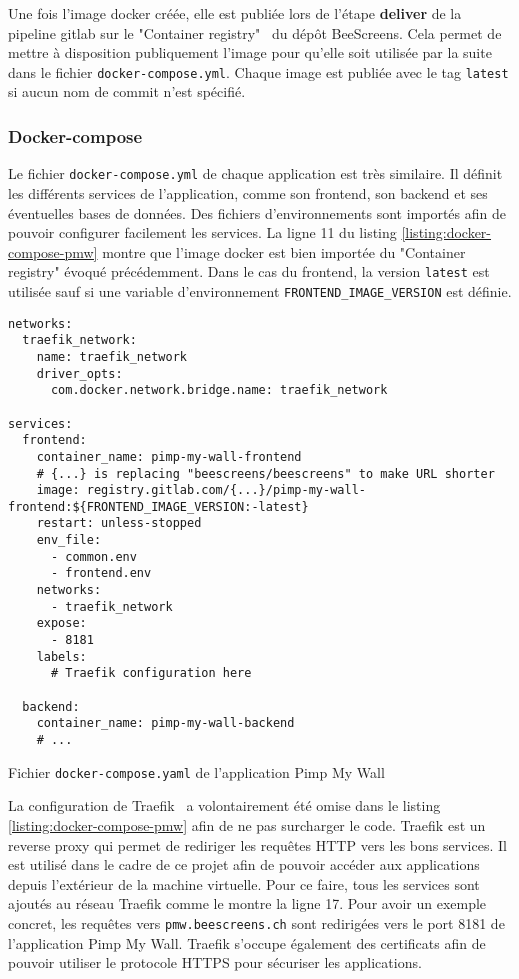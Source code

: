 Une fois l'image \gls{docker} créée, elle est publiée lors de l'étape \textbf{deliver} de la pipeline \gls{gitlab} sur le "Container registry"~\cite{beescreens-container-registry} du dépôt BeeScreens. Cela permet de mettre à disposition publiquement l'image pour qu'elle soit utilisée par la suite dans le fichier \texttt{docker-compose.yml}. Chaque image est publiée avec le tag \texttt{latest} si aucun nom de commit n'est spécifié.

\subsubsection{Docker-compose}

Le fichier \texttt{docker-compose.yml} de chaque application est très similaire. Il définit les différents services de l'application, comme son frontend, son backend et ses éventuelles bases de données. Des fichiers d'environnements sont importés afin de pouvoir configurer facilement les services. La ligne 11 du listing \ref{listing:docker-compose-pmw} montre que l'image \gls{docker} est bien importée du "Container registry" évoqué précédemment. Dans le cas du frontend, la version \texttt{latest} est utilisée sauf si une variable d'environnement \texttt{FRONTEND\_IMAGE\_VERSION} est définie.

\begin{listing}[H]
  \begin{verbatim}
networks:
  traefik_network:
    name: traefik_network
    driver_opts:
      com.docker.network.bridge.name: traefik_network

services:
  frontend:
    container_name: pimp-my-wall-frontend
    # {...} is replacing "beescreens/beescreens" to make URL shorter
    image: registry.gitlab.com/{...}/pimp-my-wall-frontend:${FRONTEND_IMAGE_VERSION:-latest}
    restart: unless-stopped
    env_file:
      - common.env
      - frontend.env
    networks:
      - traefik_network
    expose:
      - 8181
    labels:
      # Traefik configuration here

  backend:
    container_name: pimp-my-wall-backend
    # ...
\end{verbatim}
  \caption{Fichier \texttt{docker-compose.yaml} de l'application Pimp My Wall}
  \label{listing:docker-compose-pmw}
\end{listing}

La configuration de Traefik~\cite{traefik} a volontairement été omise dans le listing \ref{listing:docker-compose-pmw} afin de ne pas surcharger le code. Traefik est un reverse proxy qui permet de rediriger les requêtes HTTP vers les bons services. Il est utilisé dans le cadre de ce projet afin de pouvoir accéder aux applications depuis l'extérieur de la machine virtuelle. Pour ce faire, tous les services sont ajoutés au réseau Traefik comme le montre la ligne 17. Pour avoir un exemple concret, les requêtes vers \texttt{pmw.beescreens.ch} sont redirigées vers le port 8181 de l'application Pimp My Wall. Traefik s'occupe également des certificats afin de pouvoir utiliser le protocole HTTPS pour sécuriser les applications.

